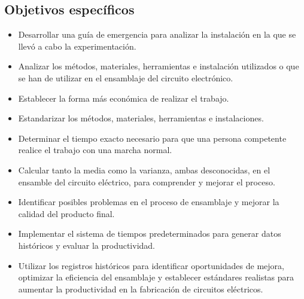     \subsection{Objetivos específicos }
    \begin{itemize}
        \item Desarrollar una guía de emergencia para analizar la instalación en la que se llevó a cabo la experimentación.
        \item Analizar los métodos, materiales, herramientas e instalación utilizados o que se han de utilizar en el ensamblaje del circuito electrónico.
        \item Establecer la forma más económica de realizar el trabajo.
        \item Estandarizar los métodos, materiales, herramientas e instalaciones.
        \item Determinar el tiempo exacto necesario para que una persona competente realice el trabajo con una marcha normal.
        \item Calcular tanto la media como la varianza, ambas desconocidas, en el ensamble del circuito eléctrico, para comprender y mejorar el proceso.
        \item Identificar posibles problemas en el proceso de ensamblaje y mejorar la calidad del producto final.
        \item Implementar el sistema de tiempos predeterminados para generar datos históricos y evaluar la productividad.
        \item Utilizar los registros históricos para identificar oportunidades de mejora, optimizar la eficiencia del ensamblaje y establecer estándares realistas para aumentar la productividad en la fabricación de circuitos eléctricos.
        \end{itemize}
